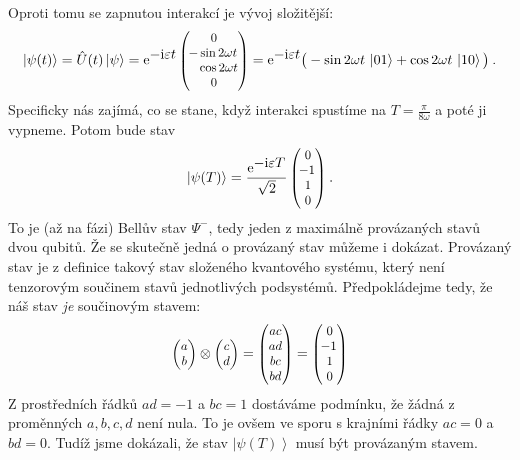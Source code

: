 \documentclass{article}
\def\ph{\phantom}
\newcommand{\const}[1]{\text{#1}}
\renewcommand{\d}[1]{\;\const{d}#1}
\newcommand{\e}[1]{\const{e}^{#1}}
\renewcommand{\i}{\const{i}}
\newcommand{\ket}[1]{\left| #1 \right>}
\newcommand{\mat}[1]{
    \begin{pmatrix}
        #1
    \end{pmatrix}
}
\newcommand{\smat}[2][1]{
    \scalebox{#1}{$\mat{#2}$}
}
\begin{document}
Oproti tomu se zapnutou interakcí je vývoj složitější:
\begin{align*}
    \ket{\psi(t)} = \hat U(t) \ket\psi
    = \e{\displaystyle -\i\varepsilon t} \, \smat[0.9]{0\\\!-\sin 2\omega t\\\ph{\!-}\cos 2\omega t \\0}
    = \e{\displaystyle -\i\varepsilon t} \big(
        -\sin 2\omega t \, \ket{01} +
        \cos 2\omega t \, \ket{10}
    \big) \: .
\end{align*}
Specificky nás zajímá, co se stane, když interakci spustíme na $T=\frac{\pi}{8\omega}$ a poté ji vypneme. Potom bude stav
\begin{align*}
    \ket{\psi(T)} = \frac{ \e{\displaystyle -\i \varepsilon T} }{\sqrt{2}} \,
    \smat[0.9]{0 \\ \!-1 \\ 1 \\ 0}
    \: .
\end{align*}
To je (až na fázi) Bellův stav $\Psi^-$, tedy jeden z maximálně provázaných stavů dvou qubitů. Že se skutečně jedná o provázaný stav můžeme i dokázat. Provázaný stav je z definice takový stav složeného kvantového systému, který není tenzorovým součinem stavů jednotlivých podsystémů. Předpokládejme tedy, že náš stav \textit{je} součinovým stavem:
\begin{align*}
    \smat[0.9]{a\\b} \otimes \smat[0.9]{c\\d}
    = \smat[0.9]{ac\\ad\\bc\\bd}
    = \smat[0.9]{0 \\ \!-1 \\ 1 \\ 0}
\end{align*}
Z prostředních řádků $ad=-1$ a $bc=1$ dostáváme podmínku, že žádná z proměnných $a,b,c,d$ není nula. To je ovšem ve sporu s krajními řádky $ac=0$ a $bd=0$. Tudíž jsme dokázali, že stav $\ket{\psi(T)}$ musí být provázaným stavem.

\bigskip
\end{document}
